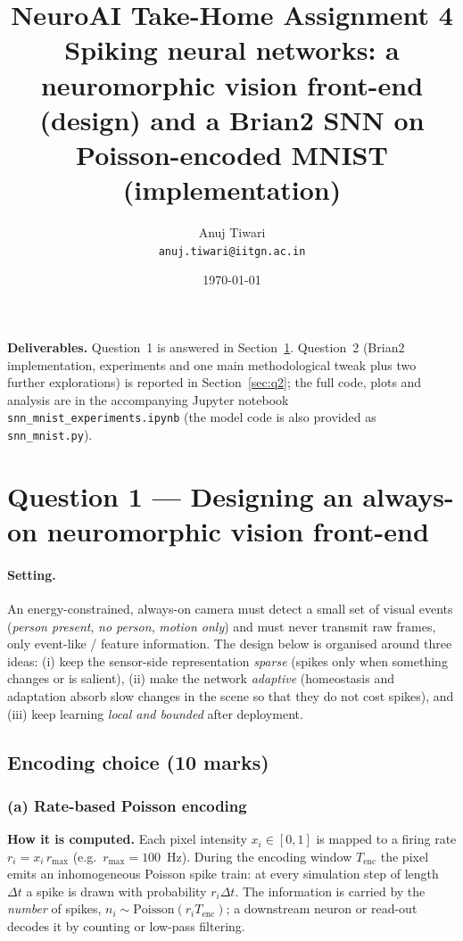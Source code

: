 \documentclass[11pt,a4paper]{article}
\title{NeuroAI Take-Home Assignment 4\\[2pt]
\large Spiking neural networks: a neuromorphic vision front-end (design) and a Brian2 SNN on Poisson-encoded MNIST (implementation)}
\author{Anuj Tiwari \\ \texttt{anuj.tiwari@iitgn.ac.in}}
\date{\today}
\begin{document}
\maketitle

\noindent\textbf{Deliverables.} Question~1 is answered in Section~\ref{sec:q1}. Question~2 (Brian2 implementation, experiments and one main methodological tweak plus two further explorations) is reported in Section~\ref{sec:q2}; the full code, plots and analysis are in the accompanying Jupyter notebook \texttt{snn\_mnist\_experiments.ipynb} (the model code is also provided as \texttt{snn\_mnist.py}).

\section{Question 1 --- Designing an always-on neuromorphic vision front-end}
\label{sec:q1}

\paragraph{Setting.} An energy-constrained, always-on camera must detect a small set of visual events (\emph{person present}, \emph{no person}, \emph{motion only}) and must never transmit raw frames, only event-like / feature information. The design below is organised around three ideas: (i) keep the sensor-side representation \emph{sparse} (spikes only when something changes or is salient), (ii) make the network \emph{adaptive} (homeostasis and adaptation absorb slow changes in the scene so that they do not cost spikes), and (iii) keep learning \emph{local and bounded} after deployment.

\subsection{Encoding choice (10 marks)}

\subsubsection*{(a) Rate-based Poisson encoding}
\textbf{How it is computed.} Each pixel intensity $x_i\in[0,1]$ is mapped to a firing rate $r_i = x_i\,r_{\max}$ (e.g.\ $r_{\max}=100$~Hz). During the encoding window $T_{\mathrm{enc}}$ the pixel emits an inhomogeneous Poisson spike train: at every simulation step of length $\Delta t$ a spike is drawn with probability $r_i\Delta t$. The information is carried by the \emph{number} of spikes, $n_i\sim\mathrm{Poisson}(r_iT_{\mathrm{enc}})$; a downstream neuron or read-out decodes it by counting or low-pass filtering.
\end{document}

